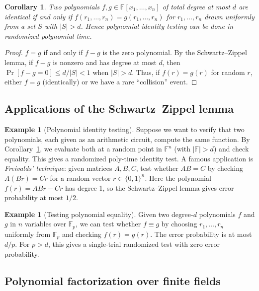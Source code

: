 \documentclass[twoside,12pt]{book}
\theoremstyle{plain}
\newtheorem{corollary}[theorem]{Corollary}
\theoremstyle{definition}
\newtheorem{example}[theorem]{Example}
\theoremstyle{remark}
\begin{document}
\begin{corollary}
\label{cor:sz-identity}
Two polynomials $f, g \in \mathbb{F}[x_1, \ldots, x_n]$ of total degree at most $d$ are identical if and only if $f(r_1, \ldots, r_n) = g(r_1, \ldots, r_n)$ for $r_1, \ldots, r_n$ drawn uniformly from a set $S$ with $|S| > d$. Hence polynomial identity testing can be done in randomized polynomial time.
\end{corollary}

\begin{proof}
$f = g$ if and only if $f - g$ is the zero polynomial. By the Schwartz--Zippel lemma, if $f - g$ is nonzero and has degree at most $d$, then $\Pr[f - g = 0] \leq d/|S| < 1$ when $|S| > d$. Thus, if $f(r) = g(r)$ for random $r$, either $f = g$ (identically) or we have a rare ``collision'' event.
\end{proof}

\subsection{Applications of the Schwartz--Zippel lemma}

\begin{example}[Polynomial identity testing]
\label{ex:pit}
Suppose we want to verify that two polynomials, each given as an arithmetic circuit, compute the same function. By Corollary~\ref{cor:sz-identity}, we evaluate both at a random point in $\mathbb{F}^n$ (with $|\mathbb{F}| > d$) and check equality. This gives a randomized poly-time identity test. A famous application is \emph{Freivalds' technique}: given matrices $A, B, C$, test whether $AB = C$ by checking $A(Br) = Cr$ for a random vector $r \in \{0,1\}^n$. Here the polynomial $f(r) = AB r - Cr$ has degree 1, so the Schwartz--Zippel lemma gives error probability at most $1/2$.
\end{example}

\begin{example}[Testing polynomial equality]
Given two degree-$d$ polynomials $f$ and $g$ in $n$ variables over $\mathbb{F}_p$, we can test whether $f \equiv g$ by choosing $r_1, \ldots, r_n$ uniformly from $\mathbb{F}_p$ and checking $f(r) = g(r)$. The error probability is at most $d/p$. For $p > d$, this gives a single-trial randomized test with zero error probability.
\end{example}

\subsection{Polynomial factorization over finite fields}
\end{document}
